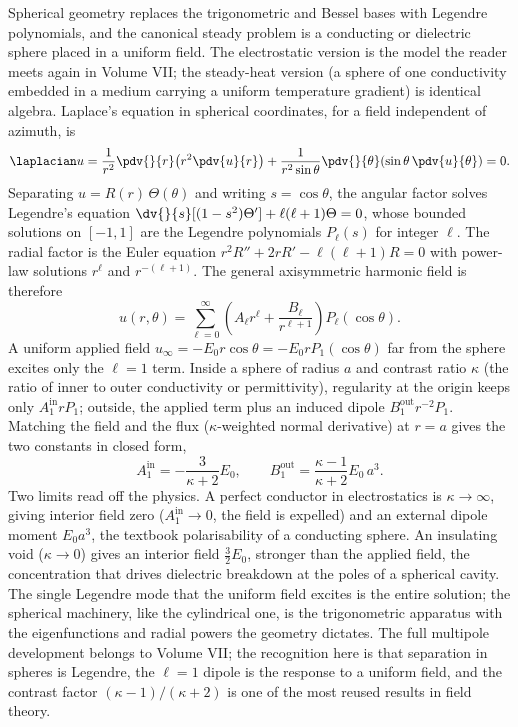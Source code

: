 \begin{mastery}
Spherical geometry replaces the trigonometric and Bessel bases with
Legendre polynomials, and the canonical steady problem is a
conducting or dielectric sphere placed in a uniform field. The
electrostatic version is the model the reader meets again in Volume
VII; the steady-heat version (a sphere of one conductivity embedded
in a medium carrying a uniform temperature gradient) is identical
algebra. Laplace's equation in spherical coordinates, for a field
independent of azimuth, is
\[
\laplacian u = \frac{1}{r^{2}}\pdv{}{r}\!\left(r^{2}\pdv{u}{r}\right)
   + \frac{1}{r^{2}\sin\theta}\pdv{}{\theta}\!\left(\sin\theta\,\pdv{u}{\theta}\right) = 0.
\]
Separating $u = R(r)\,\Theta(\theta)$ and writing $s = \cos\theta$,
the angular factor solves Legendre's equation $\dv{}{s}[(1 -
s^{2})\Theta'] + \ell(\ell+1)\Theta = 0$, whose bounded solutions
on $[-1, 1]$ are the Legendre polynomials $P_{\ell}(s)$ for integer
$\ell$. The radial factor is the Euler equation $r^{2}R'' + 2rR' -
\ell(\ell+1)R = 0$ with power-law solutions $r^{\ell}$ and
$r^{-(\ell+1)}$. The general axisymmetric harmonic field is
therefore
\[
u(r, \theta) = \sum_{\ell=0}^{\infty}
   \left(A_{\ell} r^{\ell} + \frac{B_{\ell}}{r^{\ell+1}}\right)
   P_{\ell}(\cos\theta).
\]
A uniform applied field $u_{\infty} = -E_{0} r\cos\theta = -E_{0}
r P_{1}(\cos\theta)$ far from the sphere excites only the $\ell = 1$
term. Inside a sphere of radius $a$ and contrast ratio $\kappa$
(the ratio of inner to outer conductivity or permittivity),
regularity at the origin keeps only $A_{1}^{\text{in}}r P_{1}$;
outside, the applied term plus an induced dipole $B_{1}^{\text{out}}
r^{-2}P_{1}$. Matching the field and the flux ($\kappa$-weighted
normal derivative) at $r = a$ gives the two constants in closed
form,
\[
A_{1}^{\text{in}} = -\frac{3}{\kappa + 2}E_{0}, \qquad
B_{1}^{\text{out}} = \frac{\kappa - 1}{\kappa + 2}E_{0}\,a^{3}.
\]
Two limits read off the physics. A perfect conductor in
electrostatics is $\kappa \to \infty$, giving interior field zero
($A_{1}^{\text{in}} \to 0$, the field is expelled) and an external
dipole moment $E_{0}a^{3}$, the textbook polarisability of a
conducting sphere. An insulating void ($\kappa \to 0$) gives an
interior field $\tfrac{3}{2}E_{0}$, stronger than the applied
field, the concentration that drives dielectric breakdown at the
poles of a spherical cavity. The single Legendre mode that the
uniform field excites is the entire solution; the spherical
machinery, like the cylindrical one, is the trigonometric apparatus
with the eigenfunctions and radial powers the geometry dictates.
The full multipole development belongs to Volume VII; the
recognition here is that separation in spheres is Legendre, the
$\ell = 1$ dipole is the response to a uniform field, and the
contrast factor $(\kappa-1)/(\kappa+2)$ is one of the most reused
results in field theory.
\end{mastery}

